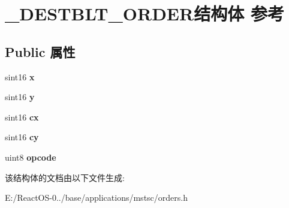 \hypertarget{struct___d_e_s_t_b_l_t___o_r_d_e_r}{}\section{\+\_\+\+D\+E\+S\+T\+B\+L\+T\+\_\+\+O\+R\+D\+E\+R结构体 参考}
\label{struct___d_e_s_t_b_l_t___o_r_d_e_r}
\subsection*{Public 属性}
\begin{DoxyCompactItemize}
\item 
\mbox{\label{struct___d_e_s_t_b_l_t___o_r_d_e_r_ab1880805f27c2f3780d5f3f7ac2b782e}} 
sint16 {\bfseries x}
\item 
\mbox{\label{struct___d_e_s_t_b_l_t___o_r_d_e_r_a461984afd51ed8630ea3aa7fabdf38a8}} 
sint16 {\bfseries y}
\item 
\mbox{\label{struct___d_e_s_t_b_l_t___o_r_d_e_r_aeb9de7534b53b0f97fab4471f62e7a00}} 
sint16 {\bfseries cx}
\item 
\mbox{\label{struct___d_e_s_t_b_l_t___o_r_d_e_r_a308ea0c410a18dbe10d2f95f15efc1e5}} 
sint16 {\bfseries cy}
\item 
\mbox{\label{struct___d_e_s_t_b_l_t___o_r_d_e_r_ab759fd2668c630a5ac7d789a29a84188}} 
uint8 {\bfseries opcode}
\end{DoxyCompactItemize}


该结构体的文档由以下文件生成\+:\begin{DoxyCompactItemize}
\item 
E\+:/\+React\+O\+S-\/0../base/applications/mstsc/orders.\+h\end{DoxyCompactItemize}
